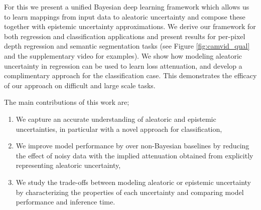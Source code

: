 \documentclass{article}
\begin{document}
For this we present a unified Bayesian deep learning framework which allows us to learn mappings from input data to aleatoric uncertainty and compose these together with epistemic uncertainty approximations. We derive our framework for both regression and classification applications and present results for per-pixel depth regression and semantic segmentation tasks (see Figure \ref{fig:camvid_qual} and the supplementary video for examples). 
We show how modeling aleatoric uncertainty in regression can be used to learn loss attenuation, and develop a complimentary approach for the classification case. 
This demonstrates the efficacy of our approach on difficult and large scale tasks.

The main contributions of this work are; 
\begin{enumerate}[topsep=0pt,itemsep=1ex,partopsep=1ex,parsep=1ex]
\item We capture an accurate understanding of aleatoric and epistemic uncertainties, in particular with a novel approach for classification,
\item We improve model performance by  over non-Bayesian baselines by reducing the effect of noisy data with the implied attenuation obtained from explicitly representing aleatoric uncertainty,
\item We study the trade-offs between modeling aleatoric or epistemic uncertainty by characterizing the properties of each uncertainty and comparing model performance and inference time.
\end{enumerate}
\end{document}
